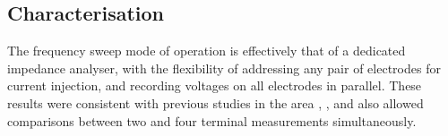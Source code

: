 \subsection{Characterisation}
The frequency sweep mode of operation is effectively that of a dedicated impedance analyser, with the flexibility of addressing any pair of electrodes for current injection, and recording voltages on all electrodes in parallel. These results were consistent with previous studies in the area \cite{Ranck_1963}, \cite{Logothetis_2007}, and also allowed comparisons between two and four terminal measurements simultaneously. 

